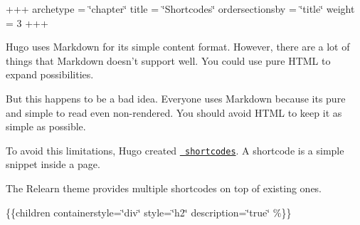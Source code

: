 +++ archetype = \char`\"{}chapter\char`\"{} title = \char`\"{}\+Shortcodes\char`\"{} ordersectionsby = \char`\"{}title\char`\"{} weight = 3 +++

Hugo uses Markdown for its simple content format. However, there are a lot of things that Markdown doesn’t support well. You could use pure HTML to expand possibilities.

But this happens to be a bad idea. Everyone uses Markdown because it\textquotesingle{}s pure and simple to read even non-\/rendered. You should avoid HTML to keep it as simple as possible.

To avoid this limitations, Hugo created \href{https://gohugo.io/extras/shortcodes/}{\texttt{ shortcodes}}. A shortcode is a simple snippet inside a page.

The Relearn theme provides multiple shortcodes on top of existing ones.

\{\{children containerstyle=\char`\"{}div\char`\"{} style=\char`\"{}h2\char`\"{} description=\char`\"{}true\char`\"{} \%\}\} 